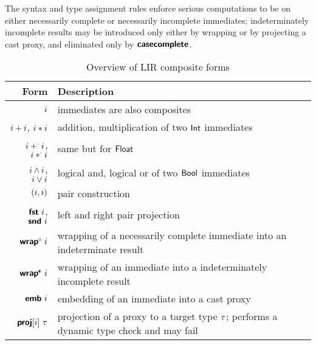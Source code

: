 \documentclass[index.tex]{subfiles}
\begin{document}
The syntax and type assignment rules enforce serious computations to be on either necessarily
complete or necessarily incomplete immediates; indeterminately incomplete results may be introduced
only either by wrapping or by projecting a cast proxy, and eliminated only by $\textsf{\textbf{casecomplete}}$.

\begin{table}
  \begin{center}
    \begin{tabular}{rl}
      \textbf{Form} & \textbf{Description} \\
      \midrule

      $i$ 
        & immediates are also composites \\
      
      $i + i$, $i * i$
        & addition, multiplication of two $\textsf{Int}$ immediates \\

      $i +^{\cdot} i$, $i *^{\cdot} i$
        & same but for $\textsf{Float}$ \\

      $i \land i$, $i \lor i$
        & logical and, logical or of two $\textsf{Bool}$ immediates \\

      $(i, i)$
        & pair construction \\

      $\textsf{\textbf{fst}}~ i$, $\textsf{\textbf{snd}}~ i$
        & left and right pair projection \\

      $\EWrapIntoNI{\SortImmVar}$
        & wrapping of a necessarily complete immediate into an indeterminate result \\

      $\EWrapIntoII{\SortImmVar}$
        & wrapping of an immediate into a indeterminately incomplete
        result \\

      $\textsf{\textbf{emb}}~ i$
        & embedding of an immediate into a cast proxy \\

      $\textsf{\textbf{proj}}[i]~ \tau$
        & projection of a proxy to a target type $\tau$; performs a dynamic type check and
        may fail \\
    \end{tabular}
  \end{center}
  \caption{Overview of LIR composite forms}
  \label{lir-syntax-comp}
\end{table}
\end{document}
